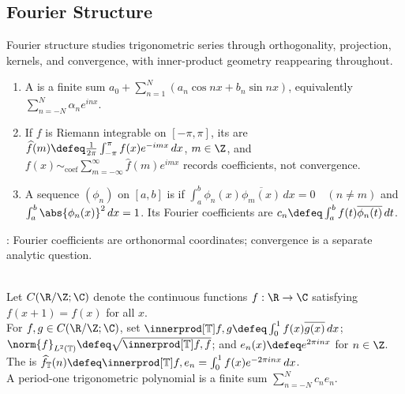 \subsection{Fourier Structure}

%


Fourier structure studies trigonometric series through orthogonality, projection, kernels, and convergence, with inner-product geometry reappearing throughout.

\begin{definition} \label{def:fourier-core-objects} 
\begin{enumerate}[label=(\roman*)]
\setlength{\itemsep}{0pt}
\item A  is a finite sum $a_0+\sum\limits_{n=1}^{N}(a_n\cos nx+b_n\sin nx)$, equivalently $\sum\limits_{n=-N}^{N}\alpha_ne^{inx}$.
\item If $f$ is Riemann integrable on $[-\pi,\pi]$, its  are $\widehat{f}(m)\defeq \frac{1}{2\pi}\int_{-\pi}^{\pi}f(x)e^{-imx}\,dx$, $m\in\Z$, and $f(x)\sim_{\mathrm{coef}}\sum\limits_{m=-\infty}^{\infty}\widehat{f}(m)e^{imx}$ records coefficients, not convergence.
\item A sequence $(\phi_n)$ on $[a,b]$ is  if $\int_a^b \phi_n(x)\overline{\phi_m(x)}\,dx=0\quad(n\neq m)$ and $\int_a^b\abs{\phi_n(x)}^2\,dx=1$. Its Fourier coefficients are $c_n\defeq\int_a^b f(t)\overline{\phi_n(t)}\,dt$.
\end{enumerate}
: Fourier coefficients are orthonormal coordinates; convergence is a separate analytic question.
\end{definition}

\begin{definition} \label{def:period-one-fourier-normalization} \\
Let $C(\R/\Z;\C)$ denote the continuous functions $f:\R\to\C$ satisfying $f(x+1)=f(x)$ for all $x$. \\
For $f,g\in C(\R/\Z;\C)$, set $\innerprod[\mathbb{T}]{f,g}\defeq \int_0^1 f(x)\overline{g(x)}\,dx$; $\norm{f}_{L^2(\mathbb{T})}\defeq \sqrt{\innerprod[\mathbb{T}]{f,f}}$; and $e_n(x)\defeq e^{2\pi i n x}$ for $n\in\Z$.\\
The  is $\widehat{f}_{\mathbb{T}}(n)\defeq \innerprod[\mathbb{T}]{f,e_n}=\int_0^1 f(x)e^{-2\pi i n x}\,dx$.\\
A period-one trigonometric polynomial is a finite sum $\sum_{n=-N}^{N}c_ne_n$.
\end{definition}

